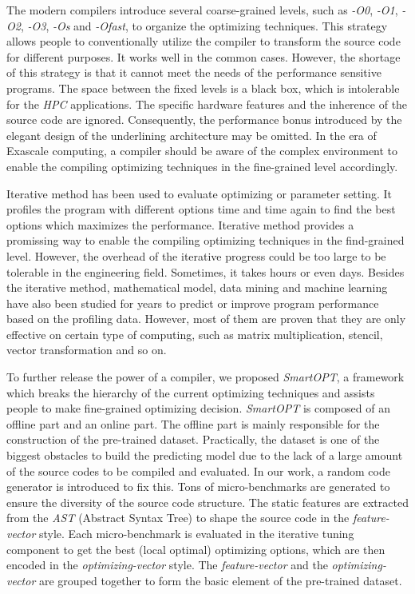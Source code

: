 \documentclass[bst/sn-mathphys]{sn-jnl}%
\theoremstyle{thmstyleone}%
\theoremstyle{thmstyletwo}%
\theoremstyle{thmstylethree}%
\begin{document}
The modern compilers introduce several coarse-grained levels, such as 
\emph{-O0}, \emph{-O1}, \emph{-O2}, \emph{-O3}, \emph{-Os} and \emph{-Ofast}, 
to organize the optimizing techniques. This  
strategy allows people to conventionally utilize the compiler to transform the 
source code for different purposes. It works well in the common cases. However, 
the shortage of this strategy is that it cannot meet the needs of the 
performance sensitive programs. The space 
between the fixed levels is a black box, which is intolerable for the 
\emph{HPC} applications. The specific hardware features and the inherence of 
the source code are ignored. Consequently, the performance 
bonus introduced by the elegant design of the underlining architecture may be 
omitted. In the era of Exascale computing, a compiler should be aware of the 
complex environment to enable the compiling optimizing techniques in the 
fine-grained level accordingly.

Iterative method has been used to evaluate optimizing or parameter setting. It 
profiles the program with different options time and time again to 
find the best options which maximizes the performance. Iterative method 
provides a promissing way to enable the compiling optimizing techniques in the 
find-grained
level. However, the overhead of the iterative progress could be too large to be 
tolerable in the engineering field. Sometimes, it takes hours or even days. 
Besides the iterative method, mathematical model, data mining and machine 
learning have also been studied for years to predict or improve program 
performance based on the profiling data. However, most of them are proven that 
they are only effective on certain type of computing, such as matrix 
multiplication, stencil, vector transformation and so on.

To further release the power of a compiler, we proposed \emph{SmartOPT}, 
a framework 
which breaks the hierarchy of the current optimizing techniques and assists 
people to make fine-grained optimizing decision. \emph{SmartOPT} is composed of 
an offline part and an online part. The offline part is mainly responsible 
for the construction of the pre-trained dataset. Practically, the dataset is 
one of the biggest obstacles to build the predicting model due to the lack of a 
large amount of the source codes to be compiled and evaluated. In our work, a 
random code generator is introduced to fix this. Tons of 
micro-benchmarks are generated to ensure the diversity of the source code 
structure. The static features are extracted from the \emph{AST} 
(Abstract Syntax Tree) to shape the source code in the 
\emph{feature-vector} style. 
Each micro-benchmark is evaluated in the iterative tuning component to get the 
best (local optimal) optimizing options, which are then encoded in the 
\emph{optimizing-vector} style. The \emph{feature-vector} and the 
\emph{optimizing-vector} are 
grouped together to form the basic element of the pre-trained dataset. 
\end{document}
